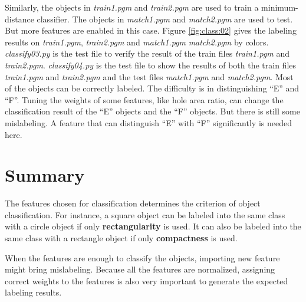 \documentclass[paper=a4, fontsize=11pt]{scrartcl}
\begin{document}
Similarly, the objects in \emph{train1.pgm} and \emph{train2.pgm} are used to train a minimum-distance classifier.
The objects in \emph{match1.pgm} and \emph{match2.pgm} are used to test.
But more features are enabled in this case.
Figure \ref{fig:class:02} gives the labeling results on \emph{train1.pgm}, \emph{train2.pgm} and \emph{match1.pgm} \emph{match2.pgm} by colors.
\emph{classify03.py} is the test file to verify the result of the train files \emph{train1.pgm} and \emph{train2.pgm}.
\emph{classify04.py} is the test file to show the results of both the train files \emph{train1.pgm} and \emph{train2.pgm} and the test files \emph{match1.pgm} and \emph{match2.pgm}.
Most of the objects can be correctly labeled. 
The difficulty is in distinguishing ``E'' and ``F''.
Tuning the weights of some features, like hole area ratio, can change the classification result of the ``E'' objects and the ``F'' objects. 
But there is still some mislabeling.
A feature that can distinguish ``E'' with ``F'' significantly is needed here.

\section{Summary}

The features chosen for classification determines the criterion of object classification.
For instance, a square object can be labeled into the same class with a circle object if only \textbf{rectangularity} is used.
It can also be labeled into the same class with a rectangle object if only \textbf{compactness} is used.

When the features are enough to classify the objects, importing new feature might bring mislabeling.
Because all the features are normalized, assigning correct weights to the features is also very important to generate the expected labeling results.




\end{document}

